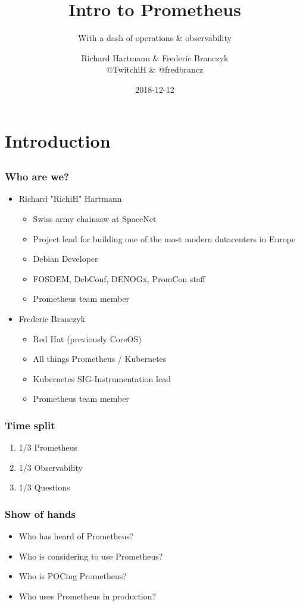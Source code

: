 \documentclass[aspectratio=169]{beamer}
\title{Intro to Prometheus}
\subtitle{With a dash of operations \& observability}
\author{Richard Hartmann \& Frederic Branczyk\\
@TwitchiH \& @fredbrancz}
\date{2018-12-12}
\begin{document}
\section{Introduction}

\subsection{}

\begin{frame}
	\titlepage
\end{frame}

\begin{frame}
	\frametitle{Who are we?}
	\begin{itemize}
		\item Richard "RichiH" Hartmann
		\begin{itemize}
			\item Swiss army chainsaw at SpaceNet
			\item Project lead for building one of the most modern datacenters in Europe
			\item Debian Developer
			\item FOSDEM, DebConf, DENOGx, PromCon staff
			\item Prometheus team member
		\end{itemize}
		\item Frederic Branczyk
		\begin{itemize}
			\item Red Hat (previously CoreOS)
			\item All things Prometheus / Kubernetes
			\item Kubernetes SIG-Instrumentation lead
			\item Prometheus team member
		\end{itemize}
	\end{itemize}
\end{frame}

\begin{frame}
	\frametitle{Time split}
	\begin{enumerate}
		\item 1/3 Prometheus
		\item 1/3 Observability
		\item 1/3 Questions
	\end{enumerate}
\end{frame}

\begin{frame}
	\frametitle{Show of hands}
	\begin{itemize}
		\item Who has heard of Prometheus?
		\item Who is considering to use Prometheus?
		\item Who is POCing Prometheus?
		\item Who uses Prometheus in production?
	\end{itemize}
\end{frame}
\end{document}
